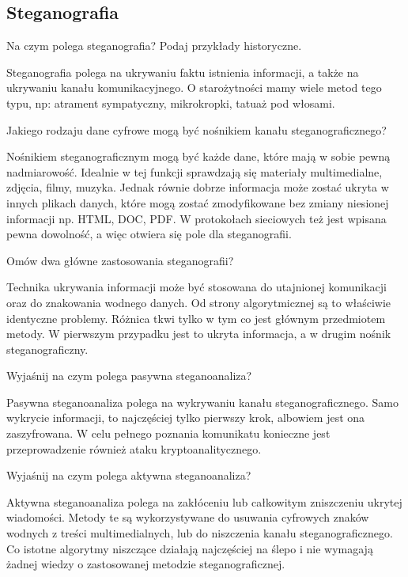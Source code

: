 \documentclass[answers,11pt]{exam}
\begin{document}
\subsection{Steganografia}

\begin{questions}

\question Na czym polega steganografia? Podaj przykłady historyczne.
\begin{solution}
Steganografia polega na ukrywaniu faktu istnienia informacji, a także na ukrywaniu kanału komunikacyjnego. O starożytności mamy wiele metod tego typu, np: atrament sympatyczny, mikrokropki, tatuaż pod włosami.
\end{solution}

\question Jakiego rodzaju dane cyfrowe mogą być nośnikiem kanału steganograficznego?
\begin{solution}
Nośnikiem steganograficznym mogą być każde dane, które mają w sobie pewną nadmiarowość. Idealnie w tej funkcji sprawdzają się materiały multimedialne, zdjęcia, filmy, muzyka. Jednak równie dobrze informacja może zostać ukryta w innych plikach danych, które mogą zostać zmodyfikowane bez zmiany niesionej informacji np. HTML, DOC, PDF. W protokołach sieciowych też jest wpisana pewna dowolność, a więc otwiera się pole dla steganografii. 
\end{solution}

\question Omów dwa główne zastosowania steganografii?
\begin{solution}
Technika ukrywania informacji może być stosowana do utajnionej komunikacji oraz do znakowania wodnego danych. Od strony algorytmicznej są to właściwie identyczne problemy. Różnica tkwi tylko w tym co jest głównym przedmiotem metody. W pierwszym przypadku jest to ukryta informacja, a w drugim nośnik steganograficzny. 
\end{solution}

\question Wyjaśnij na czym polega pasywna steganoanaliza?
\begin{solution}
Pasywna steganoanaliza polega na wykrywaniu kanału steganograficznego. Samo wykrycie informacji, to najczęściej tylko pierwszy krok, albowiem jest ona zaszyfrowana. W celu pełnego poznania komunikatu konieczne jest przeprowadzenie również ataku kryptoanalitycznego.
\end{solution}

\question Wyjaśnij na czym polega aktywna steganoanaliza?
\begin{solution}
Aktywna steganoanaliza polega na zakłóceniu lub całkowitym zniszczeniu ukrytej wiadomości. Metody te są wykorzystywane do usuwania cyfrowych znaków wodnych z treści multimedialnych, lub do niszczenia kanału steganograficznego. Co istotne algorytmy niszczące działają najczęściej na ślepo i nie wymagają żadnej wiedzy o zastosowanej metodzie steganograficznej.  
\end{solution}


\end{questions}
\end{document}
